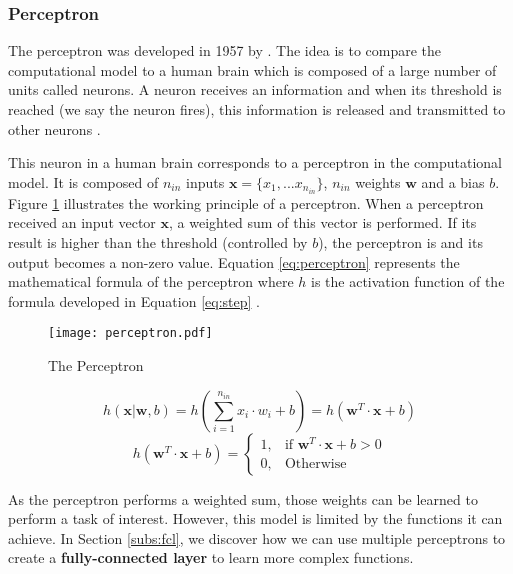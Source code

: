 \subsubsection{Perceptron} \label{subs:perceptron}
The perceptron was developed in 1957 by \textcite{rosenblatt_perceptron_1958}. The idea is to compare the computational model to a human brain which is composed of a large number of units called neurons. A neuron receives an information and when its threshold is reached (we say the neuron fires), this information is released and transmitted to other neurons \cite{rosenblatt_perceptron_1958, matteucci_artificial_2019}.

%
This neuron in a human brain corresponds to a perceptron in the computational model. It is composed of $n_{in}$ inputs $\boldsymbol{x} = \{ x_1, ... x_{n_{in}} \}$, $n_{in}$ weights $\boldsymbol{w}$ and a bias $b$. Figure \ref{fig:perceptron} illustrates the working principle of a perceptron. When a perceptron received an input vector $\boldsymbol{x}$, a weighted sum of this vector is performed. If its result is higher than the threshold (controlled by $b$), the perceptron is  and its output becomes a non-zero value.
Equation \ref{eq:perceptron} represents the mathematical formula of the perceptron where $h$ is the activation function of the formula developed in Equation \ref{eq:step} \cite{matteucci_artificial_2019}.
%
\begin{figure}[H]
    \centering
    \texttt{[image: perceptron.pdf]}
    \caption{The Perceptron}
    \label{fig:perceptron}
\end{figure}
%
\begin{equation}
    h ( \boldsymbol{x} | \boldsymbol{w}, b) = h \left( \sum^{n_{in}}_{i=1} x_i \cdot w_i + b \right) = h \left( \boldsymbol{w}^{T} \cdot \boldsymbol{x} + b \right)
    \label{eq:perceptron}
\end{equation}
%
\begin{equation}
    h ( \boldsymbol{w}^{T} \cdot \boldsymbol{x} + b) = \begin{cases} 1, & \mbox{if } \boldsymbol{w}^{T} \cdot \boldsymbol{x} + b > 0 \\ 0, & \mbox{Otherwise} \end{cases}
    \label{eq:step}
\end{equation}

As the perceptron performs a weighted sum, those weights can be learned to perform a task of interest. However, this model is limited by the functions it can achieve. In Section \ref{subs:fcl}, we discover how we can use multiple perceptrons to create a \textbf{fully-connected layer} to learn more complex functions.
